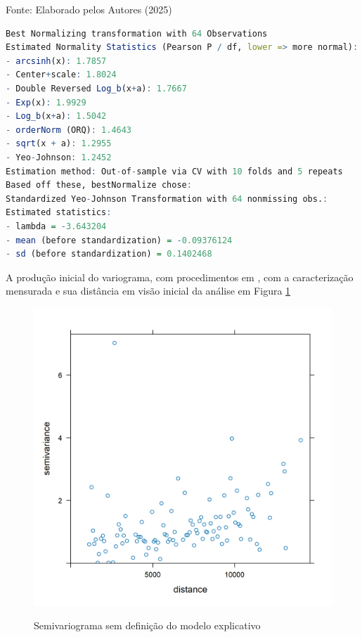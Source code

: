  			\begin{center}
 				Fonte:   Elaborado pelos Autores (2025)
 			\end{center}
 \lstset{
	language=R, %
	caption= Sujestões de melhoria ao modelo em  linguagem R} %
\begin{lstlisting}[language=R]
 Best Normalizing transformation with 64 Observations
Estimated Normality Statistics (Pearson P / df, lower => more normal):
- arcsinh(x): 1.7857
- Center+scale: 1.8024
- Double Reversed Log_b(x+a): 1.7667
- Exp(x): 1.9929
- Log_b(x+a): 1.5042
- orderNorm (ORQ): 1.4643
- sqrt(x + a): 1.2955
- Yeo-Johnson: 1.2452
Estimation method: Out-of-sample via CV with 10 folds and 5 repeats 
Based off these, bestNormalize chose:
Standardized Yeo-Johnson Transformation with 64 nonmissing obs.:
Estimated statistics:
- lambda = -3.643204 
- mean (before standardization) = -0.09376124 
- sd (before standardization) = 0.1402468
\end{lstlisting}  
% 
\hspace*{1.25 cm} A produção inicial do variograma,  com procedimentos em \cite[p.224]{Bivand}, com a caracterização mensurada e sua distância em visão inicial da análise em Figura \ref{fig:variinical}\\
 \begin{minipage}[t!]{0.5\textwidth}
 	\begin{figure}[H]
 		\centering \small \caption{Semivariograma sem definição do modelo explicativo}
 		\includegraphics[width=0.97\linewidth]{FIGURAS/variogramaPTONOS}
 		\label{fig:variinical}
 	\end{figure}	
 \end{minipage}\hfill
